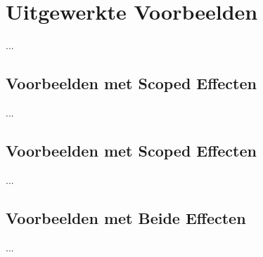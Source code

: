\chapter{Uitgewerkte Voorbeelden}
\label{hoofdstuk:voorbeelden}
...

\section{Voorbeelden met Scoped Effecten}
...

\section{Voorbeelden met Scoped Effecten}
...

\section{Voorbeelden met Beide Effecten}
...

